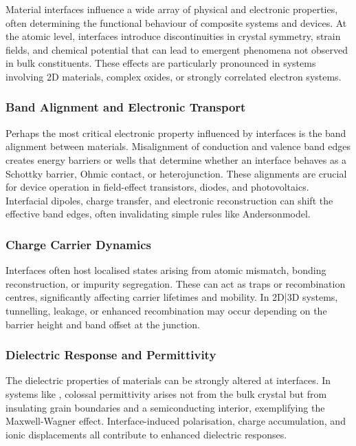 Material interfaces influence a wide array of physical and electronic properties, often determining the functional
behaviour of composite systems and devices. At the atomic level, interfaces introduce discontinuities in crystal
symmetry, strain fields, and chemical potential that can lead to emergent phenomena not observed in bulk
constituents. These effects are particularly pronounced in systems involving 2D materials, complex oxides, or
strongly correlated electron systems.

\subsubsection{Band Alignment and Electronic Transport}

Perhaps the most critical electronic property influenced by interfaces is the band alignment between materials.
Misalignment of conduction and valence band edges creates energy barriers or wells that determine whether an
interface behaves as a Schottky barrier, Ohmic contact, or heterojunction. These alignments are crucial for device
operation in field-effect transistors, diodes, and photovoltaics. Interfacial dipoles, charge transfer, and
electronic reconstruction can shift the effective band edges, often invalidating simple rules like Anderson\rqs model.

\subsubsection{Charge Carrier Dynamics}

Interfaces often host localised states arising from atomic mismatch, bonding reconstruction, or impurity
segregation. These can act as traps or recombination centres, significantly affecting carrier lifetimes and
mobility. In 2D|3D systems, tunnelling, leakage, or enhanced recombination may occur depending on the barrier height
and band offset at the junction.

\subsubsection{Dielectric Response and Permittivity}

The dielectric properties of materials can be strongly altered at interfaces. In systems like ,
colossal permittivity arises not from the bulk crystal but from insulating grain boundaries and a semiconducting
interior, exemplifying the Maxwell-Wagner effect. Interface-induced polarisation, charge accumulation, and ionic
displacements all contribute to enhanced dielectric responses.

